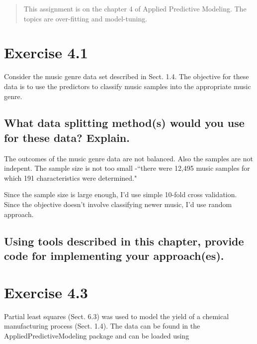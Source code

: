 \documentclass[12pt]{article}
\begin{document}

\maketitle

\begin{abstract}
This assignment is on the chapter 4 of Applied Predictive Modeling. The topics are over-fitting and model-tuning.
\end{abstract}

\section{Exercise 4.1}
Consider the music genre data set described in Sect. 1.4. The objective
for these data is to use the predictors to classify music samples into the
appropriate music genre.


\subsection{What data splitting method(s) would you use for these data? Explain.}
The outcomes of the music genre data are not balanced. Also the  samples are not indepent.
The sample size is not too small -``there were 12,495 music samples for which 191 characteristics were determined."

Since the sample size is large enough, I'd use simple 10-fold cross validation. Since the objective doesn't involve classifying newer music, I'd use random approach.

\subsection{Using tools described in this chapter, provide code for implementing your
approach(es).}
\begin{Schunk}
\end{Schunk}


\section{Exercise 4.3}
Partial least squares (Sect. 6.3) was used to model the yield of a chemical
manufacturing process (Sect. 1.4). The data can be found in the AppliedPredictiveModeling
package and can be loaded using
\end{document}
